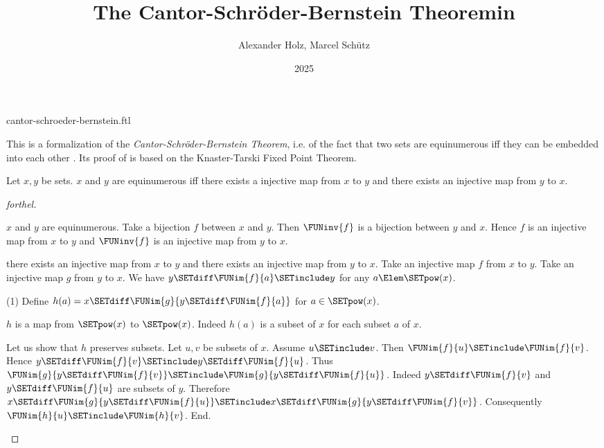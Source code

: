 \documentclass{stex}
\title{The Cantor-Schröder-Bernstein Theoremin \Naproche}
\author{Alexander Holz, Marcel Schütz}
\date{2025}
\begin{document}
\begin{smodule}{cantor-schroeder-bernstein.ftl}
\maketitle


\noindent This is a formalization of the \textit{Cantor-Schröder-Bernstein
Theorem}, i.e. of the fact that two sets are equinumerous iff they can be
embedded into each other \cite{Schroeder2012}.
Its proof of is based on the Knaster-Tarski Fixed Point Theorem.

\begin{theorem}[forthel,title=Cantor-Schröder-Bernstein,id=cantor_schroeder_bernstein]
  Let $x,y$ be sets.
  $x$ and $y$ are equinumerous iff there exists a injective map from $x$ to $y$ and there exists an injective map from $y$ to $x$.
\end{theorem}
\begin{proof}[forthel]
  \begin{case}{$x$ and $y$ are equinumerous.}
    Take a bijection $f$ between $x$ and $y$.
    Then $\FUNinv{f}$ is a bijection between $y$ and $x$.
    Hence $f$ is an injective map from $x$ to $y$ and $\FUNinv{f}$ is an
    injective map from $y$ to $x$.
  \end{case}

  \begin{case}{there exists an injective map from $x$ to $y$ and there exists an injective map from $y$ to $x$.}
    Take an injective map $f$ from $x$ to $y$.
    Take an injective map $g$ from $y$ to $x$.
    We have $y \SETdiff \FUNim{f}{a} \SETinclude y$ for any $a \Elem \SETpow(x)$.

    (1) Define $h(a) = x \SETdiff \FUNim{g}{y \SETdiff \FUNim{f}{a}}$ for $a \in \SETpow(x)$.

    $h$ is a map from $\SETpow(x)$ to $\SETpow(x)$.
    Indeed $h(a)$ is a subset of $x$ for each subset $a$ of $x$.

    Let us show that $h$ preserves subsets.
      Let $u, v$ be subsets of $x$.
      Assume $u \SETinclude v$.
      Then $\FUNim{f}{u} \SETinclude \FUNim{f}{v}$.
      Hence $y \SETdiff \FUNim{f}{v} \SETinclude y \SETdiff \FUNim{f}{u}$.
      Thus $\FUNim{g}{y \SETdiff \FUNim{f}{v}} \SETinclude \FUNim{g}{y \SETdiff \FUNim{f}{u}}$.
      Indeed $y \SETdiff \FUNim{f}{v}$ and $y \SETdiff \FUNim{f}{u}$ are subsets of $y$.
      Therefore $x \SETdiff \FUNim{g}{y \SETdiff \FUNim{f}{u}} \SETinclude x \SETdiff \FUNim{g}{y \SETdiff \FUNim{f}{v}}$.
      Consequently $\FUNim{h}{u} \SETinclude \FUNim{h}{v}$.
    End.


\end{case}
\end{proof}
\end{smodule}
\end{document}

